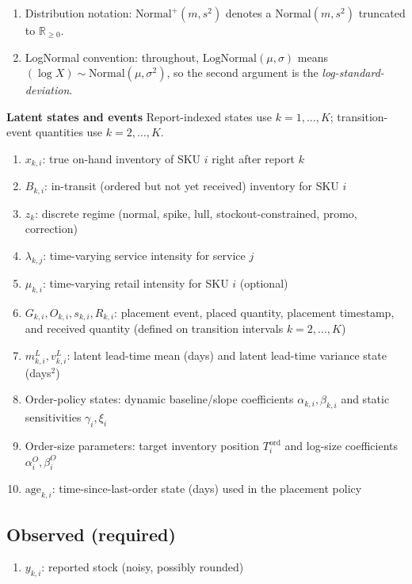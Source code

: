 \documentclass[11pt]{article}
\begin{document}
\begin{enumerate}
  For notation clarity, let $r\in\{1,\dots,R\}$ index regime types and define regime-specific parameter tables
  $\kappa_{r,j},\ \phi_{r,i},\ m^{\mathrm{adj}}_{r,i},\ s^{\mathrm{adj}}_{r,i}$.
  In interval $k$, evaluate these parameters at $r=z_k$ inside likelihood and transition terms.

  \item Distribution notation: $\text{Normal}^+(m,s^2)$ denotes a Normal$(m,s^2)$ truncated to $\mathbb{R}_{\ge 0}$.
  \item LogNormal convention: throughout, $\text{LogNormal}(\mu,\sigma)$ means $(\log X)\sim\text{Normal}(\mu,\sigma^2)$, so the second argument is the \emph{log-standard-deviation}.
\end{enumerate}

\textbf{Latent states and events}
Report-indexed states use $k=1,\dots,K$; transition-event quantities use $k=2,\dots,K$.
\begin{enumerate}
  \item $x_{k,i}$: true on-hand inventory of SKU $i$ right after report $k$
  \item $B_{k,i}$: in-transit (ordered but not yet received) inventory for SKU $i$
  \item $z_k$: discrete regime (normal, spike, lull, stockout-constrained, promo, correction)
  \item $\lambda_{k,j}$: time-varying service intensity for service $j$
  \item $\mu_{k,i}$: time-varying retail intensity for SKU $i$ (optional)
  \item $G_{k,i},O_{k,i},s_{k,i},R_{k,i}$: placement event, placed quantity, placement timestamp, and received quantity (defined on transition intervals $k=2,\dots,K$)
  \item $m^L_{k,i}, v^L_{k,i}$: latent lead-time mean (days) and latent lead-time variance state (days$^2$)
  \item Order-policy states: dynamic baseline/slope coefficients $\alpha_{k,i}, \beta_{k,i}$ and static sensitivities $\gamma_i, \xi_i$
  \item Order-size parameters: target inventory position $T^{\mathrm{ord}}_i$ and log-size coefficients $\alpha^{O}_i, \beta^{O}_i$
  \item $\text{age}_{k,i}$: time-since-last-order state (days) used in the placement policy
\end{enumerate}

\subsection*{Observed (required)}
\begin{enumerate}
  \item $y_{k,i}$: reported stock (noisy, possibly rounded)
\end{enumerate}
\end{document}
